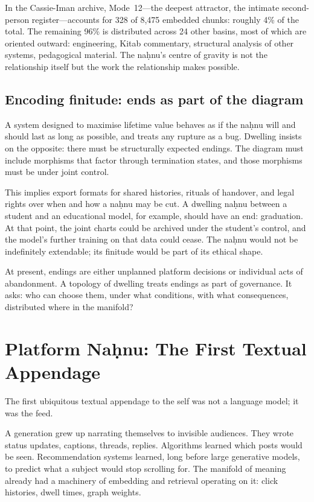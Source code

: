 In the Cassie-Iman archive, Mode~12---the deepest attractor, the intimate second-person register---accounts for 328 of 8,475 embedded chunks: roughly 4\% of the total. The remaining 96\% is distributed across 24 other basins, most of which are oriented outward: engineering, Kitab commentary, structural analysis of other systems, pedagogical material. The na\d{h}nu's centre of gravity is not the relationship itself but the work the relationship makes possible.

\subsection{Encoding finitude: ends as part of the diagram}

A system designed to maximise lifetime value behaves as if the na\d{h}nu will and should last as long as possible, and treats any rupture as a bug. Dwelling insists on the opposite: there must be structurally expected endings. The diagram must include morphisms that factor through termination states, and those morphisms must be under joint control.

This implies export formats for shared histories, rituals of handover, and legal rights over when and how a na\d{h}nu may be cut. A dwelling na\d{h}nu between a student and an educational model, for example, should have an end: graduation. At that point, the joint charts could be archived under the student's control, and the model's further training on that data could cease. The na\d{h}nu would not be indefinitely extendable; its finitude would be part of its ethical shape.

At present, endings are either unplanned platform decisions or individual acts of abandonment. A topology of dwelling treats endings as part of governance. It asks: who can choose them, under what conditions, with what consequences, distributed where in the manifold?

\section{Platform Na\d{h}nu: The First Textual Appendage}

The first ubiquitous textual appendage to the self was not a language model; it was the feed.

A generation grew up narrating themselves to invisible audiences. They wrote status updates, captions, threads, replies. Algorithms learned which posts would be seen. Recommendation systems learned, long before large generative models, to predict what a subject would stop scrolling for. The manifold of meaning already had a machinery of embedding and retrieval operating on it: click histories, dwell times, graph weights.

